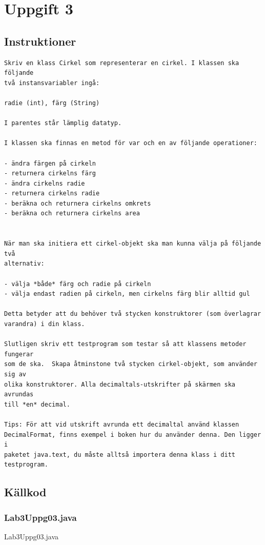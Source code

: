 \section{Uppgift 3}\label{sec:uppg03}

\subsection{Instruktioner}
\begin{verbatim}
Skriv en klass Cirkel som representerar en cirkel. I klassen ska följande
två instansvariabler ingå:

radie (int), färg (String)

I parentes står lämplig datatyp.

I klassen ska finnas en metod för var och en av följande operationer:

- ändra färgen på cirkeln
- returnera cirkelns färg
- ändra cirkelns radie
- returnera cirkelns radie
- beräkna och returnera cirkelns omkrets
- beräkna och returnera cirkelns area


När man ska initiera ett cirkel-objekt ska man kunna välja på följande två
alternativ:

- välja *både* färg och radie på cirkeln
- välja endast radien på cirkeln, men cirkelns färg blir alltid gul

Detta betyder att du behöver två stycken konstruktorer (som överlagrar
varandra) i din klass.

Slutligen skriv ett testprogram som testar så att klassens metoder fungerar
som de ska.  Skapa åtminstone två stycken cirkel-objekt, som använder sig av
olika konstruktorer. Alla decimaltals-utskrifter på skärmen ska avrundas
till *en* decimal.

Tips: För att vid utskrift avrunda ett decimaltal använd klassen
DecimalFormat, finns exempel i boken hur du använder denna. Den ligger i
paketet java.text, du måste alltså importera denna klass i ditt testprogram.
\end{verbatim}


\subsection{Källkod}
\subsubsection{Lab3Uppg03.java}
\caption{Lab3Uppg03.java}
\label{src:uppg03}

